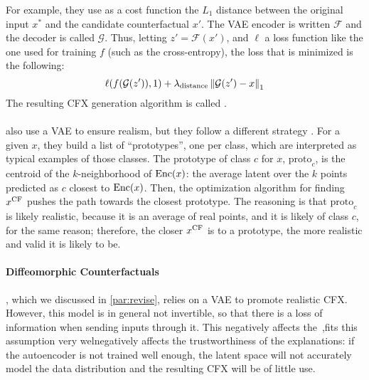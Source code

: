 \documentclass[../main.tex]{subfiles}
\begin{document}
For example, they use as a cost function the $L_1$ distance between the original input $x^{*}$ and the candidate counterfactual $x'$.
The VAE encoder is written $\mathcal{F}$ and the decoder is called $\mathcal{G}$.
Thus, letting $z' = \mathcal{F}(x')$, and $\ell$ a loss function like the one used for training $f$ (such as the cross-entropy), the loss that is minimized is the following:
\begin{equation}
	\ell(f(\mathcal{G}(z')), 1)
	+ \lambda_\text{distance} \left\lVert\mathcal{G}(z') - x\right\rVert_1
\end{equation}
The resulting CFX generation algorithm is called \revise{} \cite{joshiRealistic2019}.

\paragraph{}

\citeauthor{vanlooverenInterpretable2021} also use a VAE to ensure realism, but they follow a different strategy \cite{vanlooverenInterpretable2021}.
For a given $x$, they build a list of ``prototypes'', one per class, which are interpreted as typical examples of those classes.
The prototype of class $c$ for $x$, $\text{proto}_c$, is the centroid of the $k$-neighborhood of $\operatorname{Enc}(x)$: the average latent over the $k$ points predicted as $c$ closest to $\operatorname{Enc}(x)$.
Then, the optimization algorithm for finding $x^\mathrm{CF}$ pushes the path towards the closest prototype.
The reasoning is that $\text{proto}_c$ is likely realistic, because it is an average of real points, and it is likely of class $c$, for the same reason; therefore, the closer $x^\mathrm{CF}$ is to a prototype, the more realistic and valid it is likely to be.

\paragraph{Diffeomorphic Counterfactuals}
\label{previous_work:diffeo}

\revise{}, which we discussed in \autoref{par:revise}, relies on a VAE to promote realistic CFX.
However, this model is in general not invertible, so that there is a loss of information when sending inputs through it.
This negatively affects the \,,fits this assumption very welnegatively affects the trustworthiness of the explanations: if the autoencoder is not trained well enough, the latent space will not accurately
model the data distribution and the resulting CFX will be of little use.
\end{document}
